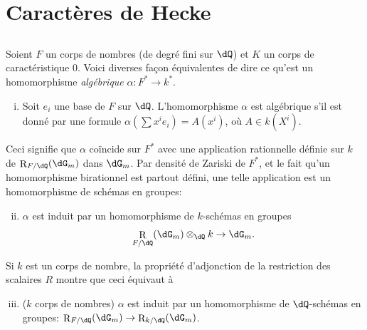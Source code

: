 \documentclass[oneside]{book}
\DeclareMathOperator{\res}{R} %
\theoremstyle{sga-source}
\theoremstyle{sga-source-dash}
\theoremstyle{sga-source-dotdash}
\theoremstyle{sga-source-number-note-dash}
\theoremstyle{sga-source-note-number-dotdash}
\theoremstyle{sga-source-example-dotdash}
\theoremstyle{sga-source-inline-number}
\theoremstyle{sga-source-bare-number}
\theoremstyle{sga-source}
\newcommand{\PrintPage}[1]{}\newcommand{\MathPage}[1]{}\newcommand{\PrintCite}[2]{#1}\newcommand{\var}[3]{#1}
\begin{document}
\PrintPage{208}
\section{Caractères de Hecke}\label{VI:5}





\subsection{}\label{VI:5-1}

Soient $F$ un corps de nombres (de degré fini sur $\dQ$) \var{et $K$ un corps}{et $k$ un corps}{S45-SOL-0859} de 
caractéristique $0$. Voici \var{diverses façon équivalentes}{diverses façons équivalentes}{S45-SOL-0860} de dire ce qu'est un 
homomorphisme \emph{algébrique} $\alpha:F^\ast \to k^\ast$. 
\begin{enumerate}[(i)]
  \item Soit $e_i$ une base de $F$ sur $\dQ$. L'homomorphisme $\alpha$ est 
    algébrique s'il est donné par une formule 
    $\alpha(\sum x^i e_i) = A(x^i)$, où $A\in k(X^i)$. 
\end{enumerate}

Ceci signifie que $\alpha$ coïncide sur $F^\ast$ avec une application 
rationnelle définie sur $k$ de $\res_{F/\dQ}(\dG_m)$ dans $\dG_m$. Par 
densité de Zariski de $F^\ast$, et le fait qu'un homomorphisme birationnel 
est partout défini, une telle application est un homomorphisme de schémas 
en groupes: 
\begin{enumerate}[(i)]
\setcounter{enumi}{1}
  \item $\alpha$ est induit par un homomorphisme de $k$-schémas en groupes 
    \[
      \res_{F/\dQ}(\dG_m)\otimes_\dQ k \to \dG_m \text{.} 
    \] 
\end{enumerate}

Si $k$ est \var{un corps de nombre,}{un corps de nombres,}{S45-SOL-0863} la propriété d'adjonction de la restriction 
des scalaires $R$ montre que ceci équivaut à 
\begin{enumerate}[(i)]
\setcounter{enumi}{2}
  \item ($k$ corps de nombres) $\alpha$ est induit par un homomorphisme de 
    $\dQ$-schémas en groupes: $\res_{F/\dQ}(\dG_m) \to \res_{k/\dQ}(\dG_m)$. 
\end{enumerate}
\end{document}
